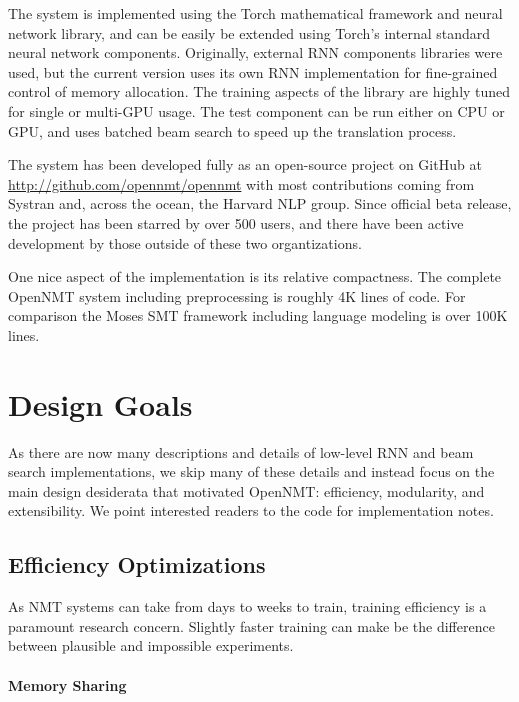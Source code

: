\documentclass[11pt]{article}
\begin{document}
The system is implemented using the Torch mathematical framework and
neural network library, and can be easily be extended using Torch's
internal standard neural network components. Originally, external RNN
components libraries were used, but the current version uses its own
RNN implementation for fine-grained control of memory allocation. The
training aspects of the library are highly tuned for single or
multi-GPU usage. The test component can be run either on CPU or GPU, and uses batched beam search to speed up the translation process.

The system has been developed fully as an open-source project on GitHub at \url{http://github.com/opennmt/opennmt} with most contributions coming from Systran and, across the ocean,  the Harvard NLP group. Since official beta release, the project has been starred by over 500 users, and there have been active development by those outside of these two organtizations. 

One nice aspect of the implementation is its relative compactness. The complete OpenNMT system including preprocessing is roughly 4K lines of code. For comparison the Moses SMT framework including language modeling is over 100K lines.   



\section{Design Goals}

As there are now many descriptions and details of low-level RNN and beam search implementations, we skip many of these details and instead focus on the main design desiderata that motivated OpenNMT: efficiency, modularity, and extensibility. 
We point interested readers to the code for implementation notes.  

\subsection{Efficiency Optimizations}

As NMT systems can take from days to weeks to train, training
efficiency is a paramount research concern. Slightly faster training
can make be the difference between plausible and impossible experiments. 

\paragraph{Memory Sharing}
\end{document}
